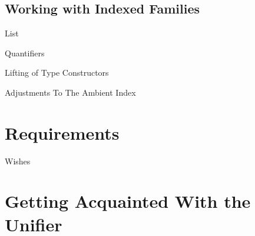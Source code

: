 \documentclass[compress,9pt]{beamer}
\begin{document}
\subsection{Working with Indexed Families}

\begin{frame}{List}
\end{frame}

\begin{frame}{Quantifiers}
\end{frame}

\begin{frame}{Lifting of Type Constructors}
\end{frame}

\begin{frame}{Adjustments To The Ambient Index}
\end{frame}

\section{Requirements}

\begin{frame}{Wishes}
\end{frame}

\section{Getting Acquainted With the Unifier}
\end{document}
